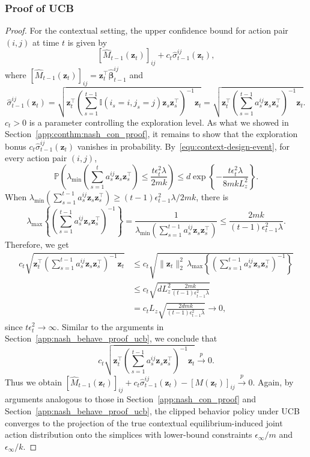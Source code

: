 \documentclass[12pt]{article}
\begin{document}
\subsubsection{Proof of UCB}
\label{app:connash_behave_proof_ucb}
\begin{proof}
For the contextual setting, the upper confidence bound for action pair $(i,j)$
at time $t$ is given by
\[
[\widehat M_{t-1}(\bm z_t)]_{ij} + c_t \widehat \sigma_{t-1}^{ij}(\bm z_t),
\]
where $[\widehat M_{t-1}(\bm z_t)]_{ij} = \bm z_t^\top \widehat{\bm\beta}_{t-1}^{ij}$
and
\[
\widehat \sigma_{t-1}^{ij}(\bm z_t) =
\sqrt{\bm z_t^\top \left(\sum_{s=1}^{t-1}
\mathbb I(i_s=i,j_s=j)\bm z_s\bm z_s^\top\right)^{-1} \bm z_t} = \sqrt{\bm z_t^\top \left(\sum_{s=1}^{t-1} a_{s}^{ij}\bm z_s\bm z_s^\top \right)^{-1} \bm z_t}.
\]
$c_t>0$ is a parameter controlling the exploration level. As what we showed in Section~\ref{app:conthm:nash_con_proof}, it remains to show that the exploration bonus $c_t \widehat \sigma_{t-1}^{ij}(\bm z_t)$ vanishes in probability.
By~\eqref{equ:context-design-event}, for every action pair $(i,j)$,
\[
\mathbb P\left( \lambda_{\min} \left(
\sum_{s=1}^t a_s^{ij}\bm z_s\bm z_s^\top
\right) \le \frac{ t\epsilon_t^2\lambda }{ 2mk } \right) \le d \exp\left\{ - \frac{ t\epsilon_t^2\lambda }{ 8mkL_z^2 } \right\}.
\]
When $\lambda_{\min}(\sum_{s=1}^{t-1} a_{s}^{ij}\bm z_s\bm z_s^\top)
\ge (t-1) \epsilon_{t-1}^2\lambda/2mk$, there is
\[
\lambda_{\max}\left\{
\left(\sum_{s=1}^{t-1} a_{s}^{ij}\bm z_s\bm z_s^\top\right)^{-1}
\right\}
=
\frac{1}{\lambda_{\min}(\sum_{s=1}^{t-1} a_{s}^{ij}\bm z_s\bm z_s^\top)}
\le
\frac{2mk}{(t-1) \epsilon_{t-1}^2 \lambda}.
\]
Therefore, we get
\begin{align*}
c_t
\sqrt{
\bm z_t^\top
\left(\sum_{s=1}^{t-1} a_{s}^{ij}\bm z_s\bm z_s^\top\right)^{-1}
\bm z_t
}
&\le
c_t
\sqrt{
\|\bm z_t\|_2^2
\,\lambda_{\max}\left\{
\left(\sum_{s=1}^{t-1} a_{s}^{ij}\bm z_s\bm z_s^\top\right)^{-1}
\right\}
} \\
&\le
c_t
\sqrt{
dL_z^2
\frac{2mk}{(t-1) \epsilon_{t-1}^2\lambda}
} \\
&=
c_t L_z
\sqrt{
\frac{2dmk}{(t-1) \epsilon_{t-1}^2\lambda}} \to 0,
\end{align*}
since $t \epsilon_t^2\to\infty$.
Similar to the arguments in Section~\ref{app:nash_behave_proof_ucb}, we conclude that
\begin{equation}
\label{equ4}
c_t \sqrt{
\bm z_t^\top
\left(\sum_{s=1}^{t-1} a_{s}^{ij}\bm z_s\bm z_s^\top\right)^{-1}
\bm z_t } \stackrel{p}{\to} 0.
\end{equation}
Thus we obtain $[\widehat M_{t-1}(\bm z_t)]_{ij} + c_t \widehat \sigma_{t-1}^{ij}(\bm z_t)-[M(\bm z_t)]_{ij} \stackrel{p}{\to} 0.$
Again, by arguments analogous to those in Section~\ref{app:nash_con_proof} and Section~\ref{app:nash_behave_proof_ucb}, the clipped behavior policy under UCB converges to the projection of the true contextual equilibrium-induced joint action distribution onto the simplices with lower-bound constraints $\epsilon_\infty/m$ and $\epsilon_\infty/k$.
\end{proof}
\end{document}
